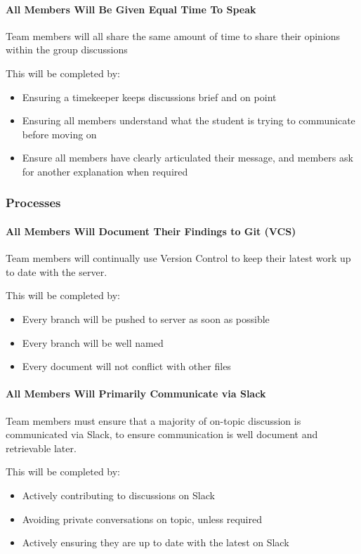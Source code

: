 \documentclass[12pt, a4paper, onecolumn]{article}
\begin{document}
\paragraph{All Members Will Be Given Equal Time To Speak}
Team members will all share the same amount of time to share their
opinions within the group discussions

This will be completed by:
\begin{itemize}
  \setlength\itemsep{1px}
  \item Ensuring a timekeeper keeps discussions brief and on point
  \item Ensuring all members understand what the student is trying
  to communicate before moving on
  \item Ensure all members have clearly articulated their message,
  and members ask for another explanation when required
\end{itemize}

\subsubsection{Processes}
\paragraph{All Members Will Document Their Findings to Git (VCS)}
Team members will continually use Version Control to keep their latest
work up to date with the server.

This will be completed by:
\begin{itemize}
  \setlength\itemsep{1px}
  \item Every branch will be pushed to server as soon as possible
  \item Every branch will be well named
  \item Every document will not conflict with other files
\end{itemize}

\paragraph{All Members Will Primarily Communicate via Slack}
Team members must ensure that a majority of on-topic discussion is
communicated via Slack, to ensure communication is well document
and retrievable later.

This will be completed by:
\begin{itemize}
  \setlength\itemsep{1px}
  \item Actively contributing to discussions on Slack
  \item Avoiding private conversations on topic, unless required
  \item Actively ensuring they are up to date with the latest on Slack
\end{itemize}
\end{document}

